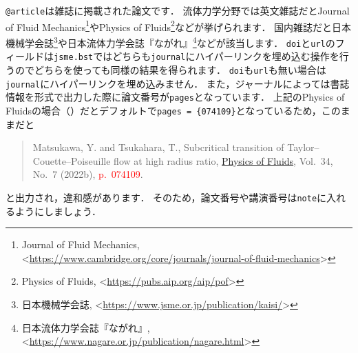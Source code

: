 \documentclass[a4paper,fleqn,uplatex,dvipdfmx]{jsarticle}
\newcommand{\jsmefile}{\texttt{jsme.bst}}
\begin{document}
\texttt{@article}は雑誌に掲載された論文です．
流体力学分野では英文雑誌だとJournal of Fluid Mechanics\footnote{Journal of Fluid Mechanics, \textless\url{https://www.cambridge.org/core/journals/journal-of-fluid-mechanics}\textgreater}やPhysics of Fluids\footnote{Physics of Fluids, \textless\url{https://pubs.aip.org/aip/pof}\textgreater}などが挙げられます．
国内雑誌だと日本機械学会誌\footnote{日本機械学会誌, \textless\url{https://www.jsme.or.jp/publication/kaisi/}\textgreater}や日本流体力学会誌『ながれ』\footnote{日本流体力学会誌『ながれ』, \textless\url{https://www.nagare.or.jp/publication/nagare.html}\textgreater}などが該当します．
\verb|doi|と\verb|url|のフィールドは\jsmefile ではどちらも\verb|journal|にハイパーリンクを埋め込む操作を行うのでどちらを使っても同様の結果を得られます．
\verb|doi|も\verb|url|も無い場合は\verb|journal|にハイパーリンクを埋め込みません．
また，ジャーナルによっては書誌情報を\BibTeX{}形式で出力した際に論文番号が\verb|pages|となっています．
上記のPhysics of Fluidsの場合（\citealp{Matsukawa:PoF2022}）だとデフォルトで\verb|pages = {074109}|となっているため，このままだと
\begin{quote}
    Matsukawa, Y. and Tsukahara, T., Subcritical transition of Taylor--Couette--Poiseuille flow at high radius ratio, \href{https://doi.org/10.1063/5.0096676}{Physics of Fluids}, Vol.~34, No.~7 (2022b), \textcolor{red}{p.~074109}.
\end{quote}
と出力され，違和感があります．
そのため，論文番号や講演番号は\verb|note|に入れるようにしましょう．
\end{document}
